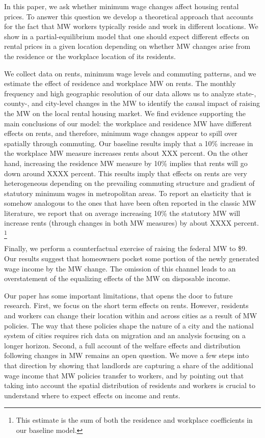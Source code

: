 
In this paper, we ask whether minimum wage changes affect housing rental prices.
To answer this question we develop a theoretical approach that accounts for
the fact that MW workers typically reside and work in different locations.
We show in a partial-equilibrium model that one should expect different effects
on rental prices in a given location depending on whether MW changes arise from the 
residence or the workplace location of its residents.

We collect data on rents, minimum wage levels and commuting patterns, and we
estimate the effect of residence and workplace MW on rents.
The monthly frequency and high geographic resolution of our data allows us to 
analyze state-, county-, and city-level changes in the MW to identify the causal 
impact of raising the MW on the local rental housing market.
We find evidence supporting the main conclusions of our model: the workplace and 
residence MW have different effects on rents, and therefore, minimum wage changes 
appear to spill over spatially through commuting. Our baseline results imply that 
a 10\% increase in the workplace MW measure increases rents about XXX percent. 
On the other hand, increasing the residence MW measure by 10\% implies that 
rents will go down around XXXX percent. This results imply that effects on rents are 
very heterogeneous depending on the prevailing commuting structure and gradient of 
statutory minimum wages in metropolitan areas. To report an elasticity that is somehow 
analogous to the ones  that have been often reported in the classic MW literature, 
we report that on average increasing 10\% the statutory MW will increase rents (through 
changes in both MW measures) by about XXXX percent. \footnote{This estimate is the sum of 
both the residence and workplace coefficients in our baseline model.}

Finally, we perform a counterfactual exercise of raising the federal MW to \$9. Our 
results suggest that homeowners pocket some portion of the newly generated wage income 
by the MW change. The omission of this channel leads to an overstatement of the equalizing 
effects of the MW on disposable income.

Our paper has some important limitations, that opens the door to future research. First,
we focus on the short term effects on rents. However, residents and workers can change their 
location within and across cities as a result of MW policies. The way that these policies shape 
the nature of a city and the national system of cities requires rich data on migration and an 
analysis focusing on a longer horizon.
Second, a full account of the welfare effects and distribution following changes in MW remains 
an open question. We move a few steps into that direction by showing that landlords are 
capturing a share of the additional wage income that MW policies transfer to workers, and 
by pointing out that taking into account the spatial distribution of residents and workers 
is crucial to understand where to expect effects on income and rents.  
